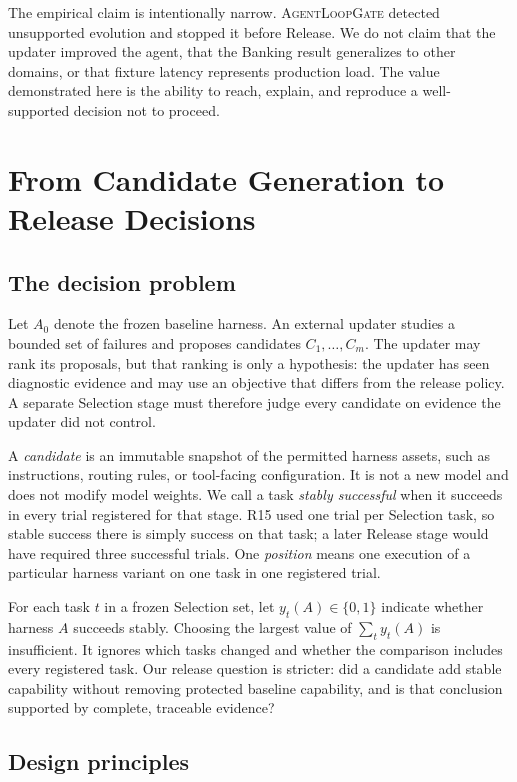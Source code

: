 \documentclass[10pt,twocolumn]{article}
\newcommand{\system}{\textsc{AgentLoopGate}\xspace}
\begin{document}
The empirical claim is intentionally narrow. \system detected unsupported
evolution and stopped it before Release. We do not claim that the updater
improved the agent, that the Banking result generalizes to other domains, or
that fixture latency represents production load. The value demonstrated here
is the ability to reach, explain, and reproduce a well-supported decision not
to proceed.

\section{From Candidate Generation to Release Decisions}

\subsection{The decision problem}

Let $A_0$ denote the frozen baseline harness. An external updater studies a
bounded set of failures and proposes candidates $C_1,\ldots,C_m$. The updater
may rank its proposals, but that ranking is only a hypothesis: the updater has
seen diagnostic evidence and may use an objective that differs from the
release policy. A separate Selection stage must therefore judge every
candidate on evidence the updater did not control.

A \emph{candidate} is an immutable snapshot of the permitted harness assets,
such as instructions, routing rules, or tool-facing configuration. It is not a
new model and does not modify model weights. We call a task \emph{stably
successful} when it succeeds in every trial registered for that stage. R15
used one trial per Selection task, so stable success there is simply success on
that task; a later Release stage would have required three successful trials.
One \emph{position} means one execution of a particular harness variant on one
task in one registered trial.

For each task $t$ in a frozen Selection set, let
$y_t(A)\in\{0,1\}$ indicate whether harness $A$ succeeds stably. Choosing the
largest value of $\sum_t y_t(A)$ is insufficient. It ignores which tasks
changed and whether the comparison includes every registered task. Our release
question is stricter: did a candidate add stable capability without removing
protected baseline capability, and is that conclusion supported by complete,
traceable evidence?

\subsection{Design principles}
\end{document}
